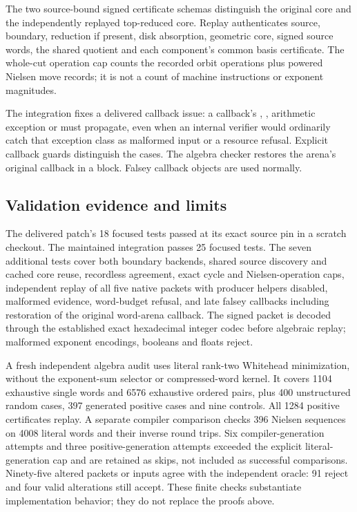 The two source-bound signed certificate schemas distinguish the original
core and the independently replayed top-reduced core.  Replay authenticates
source, boundary, reduction if present, disk absorption, geometric core,
signed source words, the shared quotient and each component's common
basis certificate.  The whole-cut operation cap counts the recorded
orbit operations plus powered Nielsen move records; it is not a count
of machine instructions or exponent magnitudes.

The integration fixes a delivered callback issue: a callback's
, , arithmetic exception or
 must propagate, even when an internal verifier
would ordinarily catch that exception class as malformed input or a
resource refusal.  Explicit callback guards distinguish the cases.
The algebra checker restores the arena's original callback in a
 block.  Falsey callback objects are used normally.

\subsection{Validation evidence and limits}

The delivered patch's 18 focused tests passed at its exact source pin
in a scratch checkout.  The maintained integration passes 25 focused
tests.  The seven additional tests cover both boundary backends, shared
source discovery and cached core reuse, recordless agreement, exact
cycle and Nielsen-operation caps, independent replay of all five native
packets with producer helpers disabled, malformed evidence, word-budget
refusal, and late falsey callbacks including restoration of the original
word-arena callback.  The signed packet is decoded through the established
exact hexadecimal integer codec before algebraic replay; malformed exponent
encodings, booleans and floats reject.

A fresh independent algebra audit uses literal rank-two Whitehead
minimization, without the exponent-sum selector or compressed-word
kernel.  It covers 1104 exhaustive single words and 6576 exhaustive
ordered pairs, plus 400 unstructured random cases, 397 generated
positive cases and nine controls.  All 1284 positive certificates replay.
A separate compiler comparison checks 396 Nielsen sequences on 4008
literal words and their inverse round trips.  Six compiler-generation
attempts and three positive-generation attempts exceeded the explicit
literal-generation cap and are retained as skips, not included as
successful comparisons.  Ninety-five altered packets or inputs agree
with the independent oracle: 91 reject and four valid alterations still
accept.  These finite checks substantiate implementation behavior;
they do not replace the proofs above.

